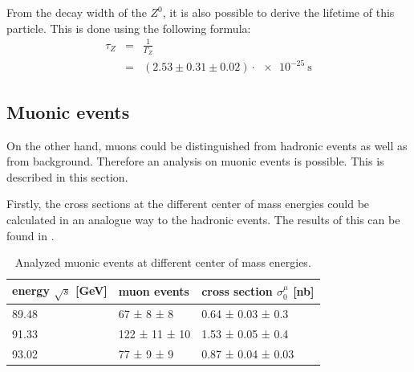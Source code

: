 \documentclass[epj,nopacs]{svjour}
\begin{document}
From the decay width of the $Z^0$, it is also possible to derive the lifetime
of this particle. This is done using the following formula:
\begin{eqnarray}
τ_Z &=& \frac{1}{Γ_Z}\\
\nonumber &=& (2.53 \pm 0.31 \pm 0.02) \cdot \SI{e-25}{\second}
\end{eqnarray}

\subsection{Muonic events}

On the other hand, muons could be distinguished from hadronic events as well as
from background. Therefore an analysis on muonic events is possible. This is
described in this section.

Firstly, the cross sections at the different center of mass energies could be
calculated in an analogue way to the hadronic events. The results of this can
be found in .

\begin{table}[h]
\begin{center}
\begin{tabular}{|l|l|l|}
\hline
energy $\sqrt{s}$ [\si{\GeV}] & muon events & cross section $σ_0^μ$ [\si{\nano\barn}]\\
\hline
89.48 & \phantom{0}67 ± \phantom{0}8 ± \phantom{0}8  & 0.64 ± 0.03 ± 0.3 \\
91.33 & 122 ± 11 ± 10 & 1.53 ± 0.05 ± 0.4 \\
93.02 & \phantom{0}77 ± \phantom{0}9 ± \phantom{0}9 & 0.87 ± 0.04 ± 0.03 \\
\hline
\end{tabular}
\vspace*{0.3cm}
\caption{\baselineskip=0.38cm Analyzed muonic events at different center of mass
energies.}
\label{tab:muon_events}
\end{center}
\vspace*{-0.5cm}
\end{table}
\end{document}
